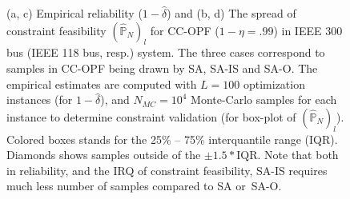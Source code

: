 \begin{figure}[hbt]


\caption{(a, c) Empirical reliability ($1-\hat{\delta}$) and (b, d) The spread of constraint feasibility $(\hat{\mathbb{P}}_N)_l$ for CC-OPF ($1-\eta =.99$) in IEEE 300 bus (IEEE 118 bus, resp.) system. The three cases correspond to samples in CC-OPF being drawn by SA, SA-IS and SA-O. The empirical estimates are computed with $L = 100$ optimization instances (for $1-\hat{\delta}$), and $N_{MC}=10^4$ Monte-Carlo samples for each instance to determine constraint validation (for box-plot of $(\hat{\mathbb{P}}_N)_l$). 
Colored boxes stands for the 25\% -- 75\% interquantile range (IQR). Diamonds shows samples outside of the $\pm 1.5*\text{IQR}$. 
Note that both in reliability, and the IRQ of constraint feasibility, SA-IS requires much less number of samples compared to SA or~SA-O.}
\label{fig:ieee118}
\end{figure}

